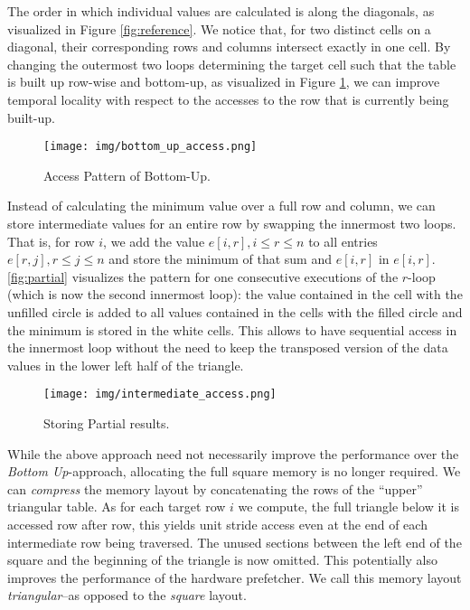  The order in which individual values are calculated is
along the diagonals, as visualized in Figure \ref{fig:reference}. We notice
that, for two distinct cells on a diagonal, their corresponding rows and
columns intersect exactly in one cell. By changing the outermost two loops
determining the target cell such that the table is built up row-wise and
bottom-up, as visualized in Figure \ref{fig:bottom-up}, we can improve
temporal locality with respect to the accesses to the row that is currently
being built-up.

\begin{figure}[htb]\centering
	\texttt{[image: img/bottom\_up\_access.png]}
  \caption{Access Pattern of Bottom-Up.\label{fig:bottom-up}}
\end{figure}

 Instead of calculating the minimum value over a full row
and column, we can store intermediate values for an entire row by swapping the
innermost two loops. That is, for row $i$, we add the value $e[i,r], i\leq r\leq
n$ to all entries $e[r,j], r\leq j \leq n$ and store the minimum of that sum and
$e[i,r]$ in $e[i,r]$. \autoref{fig:partial} visualizes the pattern for one
consecutive executions of the $r$-loop (which is now the second innermost loop):
the value contained in the cell with the unfilled circle is added to all values
contained in the cells with the filled circle and the minimum is stored in the
white cells. This allows to have sequential access in the innermost loop
without the need to keep the transposed version of the data values in the
lower left half of the triangle.

\begin{figure}[htb]\centering
	\texttt{[image: img/intermediate\_access.png]}
  \caption{Storing Partial results.\label{fig:partial}}
\end{figure}

 While the above approach need not necessarily improve
the performance over the \emph{Bottom Up}-approach, allocating the full
square memory is no longer required. We can \emph{compress} the memory
layout by concatenating the rows of the ``upper'' triangular table.  As for
each target row $i$ we compute, the full triangle below it is accessed row
after row, this yields unit stride access even at the end of each
intermediate row being traversed. The unused sections between the left end
of the square and the beginning of the triangle is now omitted. This
potentially also improves the performance of the hardware prefetcher. We
call this memory layout \emph{triangular}--as opposed to the \emph{square}
layout.


